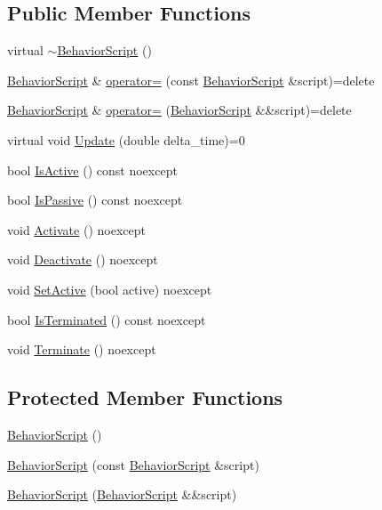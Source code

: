 \subsection*{Public Member Functions}
\begin{DoxyCompactItemize}
\item 
virtual \hyperlink{classmage_1_1_behavior_script_a61e4825ba0fc7746d49faa44ed7bc481}{$\sim$\+Behavior\+Script} ()
\item 
\hyperlink{classmage_1_1_behavior_script}{Behavior\+Script} \& \hyperlink{classmage_1_1_behavior_script_a0b3327ebf7009e668a7022d254cb1d51}{operator=} (const \hyperlink{classmage_1_1_behavior_script}{Behavior\+Script} \&script)=delete
\item 
\hyperlink{classmage_1_1_behavior_script}{Behavior\+Script} \& \hyperlink{classmage_1_1_behavior_script_a528c2bd218f2e6bb7d0a8ee50a05bf01}{operator=} (\hyperlink{classmage_1_1_behavior_script}{Behavior\+Script} \&\&script)=delete
\item 
virtual void \hyperlink{classmage_1_1_behavior_script_a905b6c83640cb91d19fecab3435f6feb}{Update} (double delta\+\_\+time)=0
\item 
bool \hyperlink{classmage_1_1_behavior_script_a856e1b420ea0ead36adafa750237325c}{Is\+Active} () const noexcept
\item 
bool \hyperlink{classmage_1_1_behavior_script_a40e33539ca7013a13ef127af11bff3e1}{Is\+Passive} () const noexcept
\item 
void \hyperlink{classmage_1_1_behavior_script_a84a5bf0fc7ec3ecd36dddaf001143b54}{Activate} () noexcept
\item 
void \hyperlink{classmage_1_1_behavior_script_ab45260db9c30d596b1d688a01458f63e}{Deactivate} () noexcept
\item 
void \hyperlink{classmage_1_1_behavior_script_ab0dc76b101fd514c6e9f8799de382e8a}{Set\+Active} (bool active) noexcept
\item 
bool \hyperlink{classmage_1_1_behavior_script_abb1625dbaa3b1145009ea474b082938f}{Is\+Terminated} () const noexcept
\item 
void \hyperlink{classmage_1_1_behavior_script_a2beae460bb84a135aa7e29c7baf6b25b}{Terminate} () noexcept
\end{DoxyCompactItemize}
\subsection*{Protected Member Functions}
\begin{DoxyCompactItemize}
\item 
\hyperlink{classmage_1_1_behavior_script_ad064a6bbe2ba5f7622d1d20eeec958bf}{Behavior\+Script} ()
\item 
\hyperlink{classmage_1_1_behavior_script_ab95b988867dfb8592ab7678bff608116}{Behavior\+Script} (const \hyperlink{classmage_1_1_behavior_script}{Behavior\+Script} \&script)
\item 
\hyperlink{classmage_1_1_behavior_script_aa8f509053f6bb9dbfd3baa75bdd8b91e}{Behavior\+Script} (\hyperlink{classmage_1_1_behavior_script}{Behavior\+Script} \&\&script)
\end{DoxyCompactItemize}
